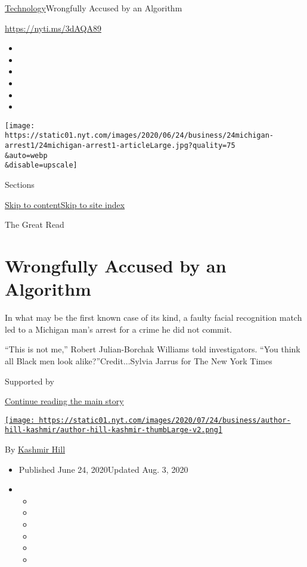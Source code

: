 \href{/section/technology}{Technology}\textbar{}Wrongfully Accused by an
Algorithm

\url{https://nyti.ms/3dAQA89}

\begin{itemize}
\item
\item
\item
\item
\item
\item
\end{itemize}

\texttt{[image: https://static01.nyt.com/images/2020/06/24/business/24michigan-arrest1/24michigan-arrest1-articleLarge.jpg?quality=75\\\&auto=webp\\\&disable=upscale]}

Sections

\protect\hyperlink{site-content}{Skip to
content}\protect\hyperlink{site-index}{Skip to site index}

The Great Read

\hypertarget{wrongfully-accused-by-an-algorithm}{%
\section{Wrongfully Accused by an
Algorithm}\label{wrongfully-accused-by-an-algorithm}}

In what may be the first known case of its kind, a faulty facial
recognition match led to a Michigan man's arrest for a crime he did not
commit.

``This is not me,'' Robert Julian-Borchak Williams told investigators.
``You think all Black men look alike?''Credit...Sylvia Jarrus for The
New York Times

Supported by

\protect\hyperlink{after-sponsor}{Continue reading the main story}

\href{https://www.nytimes.com/by/kashmir-hill}{\texttt{[image: https://static01.nyt.com/images/2020/07/24/business/author-hill-kashmir/author-hill-kashmir-thumbLarge-v2.png]}}

By \href{https://www.nytimes.com/by/kashmir-hill}{Kashmir Hill}

\begin{itemize}
\item
  Published June 24, 2020Updated Aug. 3, 2020
\item
  \begin{itemize}
  \item
  \item
  \item
  \item
  \item
  \item
  \end{itemize}
\end{itemize}

